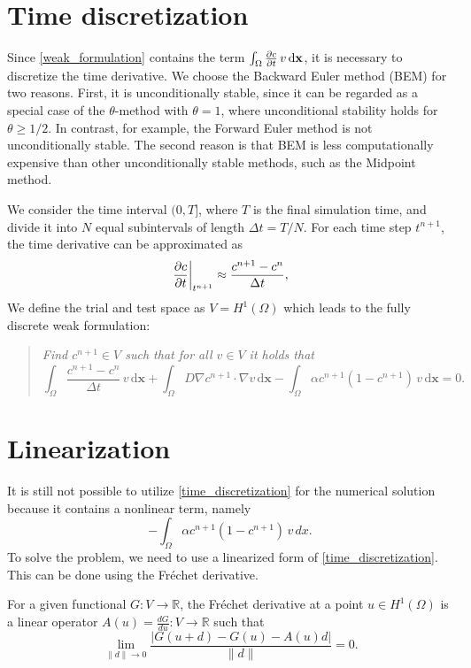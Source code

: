 \documentclass[12pt, a4paper, twoside, openright]{report}
\begin{document}
\section{Time discretization}
Since \autoref{weak_formulation} contains the term $\int_{\Omega} \pdv{c}{t} \, v \, \mathrm{d}\mathbf{x}$, it is necessary to discretize the time derivative.
We choose the Backward Euler method (BEM) for two reasons. First, it is unconditionally stable, since it can be regarded as a special case of the $\theta$-method with $\theta=1$, where unconditional stability holds for $\theta \geq 1/2$. In contrast, for example, the Forward Euler method is not unconditionally stable. The second reason is that BEM is less computationally expensive than other unconditionally stable methods, such as the Midpoint method.

We consider the time interval $(0, T]$, where $T$ is the final simulation time, and divide it into $N$ equal subintervals of length $\Delta t = T/N$. For each time step $t^{n+1}$, the time derivative can be approximated as
\[
  \left. \pdv{c}{t} \right|_{t^{n+1}} \approx \frac{c^{n+1} - c^n}{\Delta t},
\]
We define the trial and test space as $V = H^1(\Omega)$ which leads to the fully discrete weak formulation:
\begin{quote}
  \textit{Find $c^{n+1} \in V$ such that for all $v \in V$ it holds that}
  \begin{equation}
    \label{time_discretization}
    \int_{\Omega} \frac{c^{n+1} - c^n}{\Delta t} \, v \, \mathrm{d}\mathbf{x}
    + \int_{\Omega} D \nabla c^{n+1} \cdot \nabla v \, \mathrm{d}\mathbf{x}
    - \int_{\Omega} \alpha c^{n+1}(1-c^{n+1}) \, v \, \mathrm{d}\mathbf{x} = 0.
  \end{equation}
\end{quote}


\section{Linearization}

It is still not possible to utilize \autoref{time_discretization} for the numerical solution because it contains a nonlinear term, namely
\[
  - \int_{\Omega} \alpha c^{n+1}(1-c^{n+1}) \, v \, dx .
\]
To solve the problem, we need to use a linearized form of \autoref{time_discretization}. This can be done using the Fréchet derivative.

For a given functional $G : V \rightarrow \mathbb{R}$, the Fréchet derivative at a point $u \in H^1(\Omega)$ is a linear operator $A(u) = \frac{dG}{du}: V \rightarrow \mathbb{R}$ such that
\[
  \lim_{\|d\| \to 0} \frac{\left| G(u + d) - G(u) - A(u)d \right|}{\|d\|} = 0 .
\]
\end{document}

